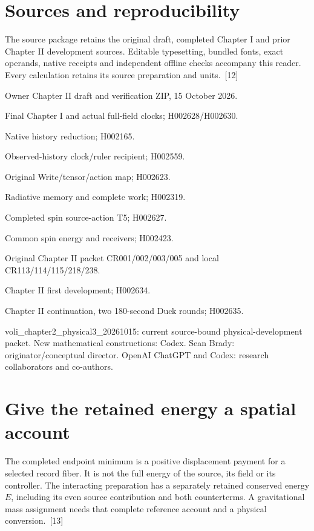 \documentclass[10pt,twocolumn,letterpaper]{article}
\begin{document}
\section{Sources and reproducibility}
The source package retains the original draft, completed Chapter I and prior Chapter II development sources. Editable typesetting, bundled fonts, exact operands, native receipts and independent offline checks accompany this reader. Every calculation retains its source preparation and units.~[12]

\begingroup\footnotesize\raggedright
\noindent[1] Owner Chapter II draft and verification ZIP, 15 October 2026.

\noindent[2] Final Chapter I and actual full-field clocks; H002628/H002630.

\noindent[3] Native history reduction; H002165.

\noindent[4] Observed-history clock/ruler recipient; H002559.

\noindent[5] Original Write/tensor/action map; H002623.

\noindent[6] Radiative memory and complete work; H002319.

\noindent[7] Completed spin source-action T5; H002627.

\noindent[8] Common spin energy and receivers; H002423.

\noindent[9] Original Chapter II packet CR001/002/003/005 and local CR113/114/115/218/238.

\noindent[10] Chapter II first development; H002634.

\noindent[11] Chapter II continuation, two 180-second Duck rounds; H002635.

\noindent[12] voli\_chapter2\_physical3\_20261015: current source-bound physical-development packet. New mathematical constructions: Codex. Sean Brady: originator/conceptual director. OpenAI ChatGPT and Codex: research collaborators and co-authors.

\par\endgroup


\section{Give the retained energy a spatial account}
The completed endpoint minimum is a positive displacement payment for a selected record fiber. It is not the full energy of the source, its field or its controller. The interacting preparation has a separately retained conserved energy $E$, including its even source contribution and both counterterms. A gravitational mass assignment needs that complete reference account and a physical conversion.~[13]
\end{document}
